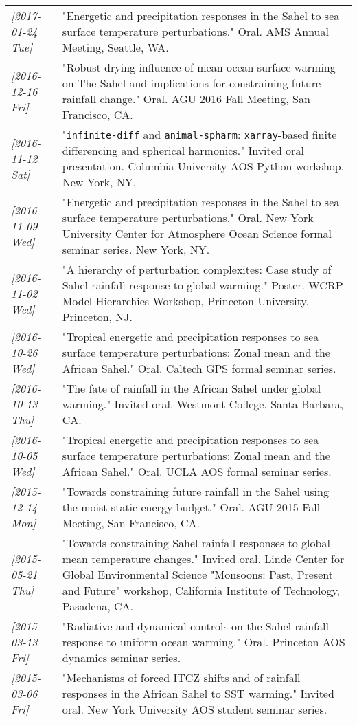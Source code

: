 \documentclass[12pt,letterpaper]{shillcv}
\begin{document}
\begin{center}
\begin{tabularx}{\textwidth}{lX}
\textit{[2017-01-24 Tue]} & "Energetic and precipitation responses in the Sahel to sea surface temperature perturbations."  Oral.  AMS Annual Meeting, Seattle, WA.\\
\textit{[2016-12-16 Fri]} & "Robust drying influence of mean ocean surface warming on The Sahel and implications for constraining future rainfall change."  Oral.  AGU 2016 Fall Meeting, San Francisco, CA.\\
\textit{[2016-11-12 Sat]} & "\texttt{infinite-diff} and \texttt{animal-spharm}: \texttt{xarray}-based finite differencing and spherical harmonics."  Invited oral presentation.  Columbia University AOS-Python workshop.  New York, NY.\\
\textit{[2016-11-09 Wed]} & "Energetic and precipitation responses in the Sahel to sea surface temperature perturbations."  Oral.  New York University Center for Atmosphere Ocean Science formal seminar series.  New York, NY.\\
\textit{[2016-11-02 Wed]} & "A hierarchy of perturbation complexites: Case study of Sahel rainfall response to global warming."  Poster.  WCRP Model Hierarchies Workshop, Princeton University, Princeton, NJ.\\
\textit{[2016-10-26 Wed]} & "Tropical energetic and precipitation responses to sea surface temperature perturbations: Zonal mean and the African Sahel."  Oral.  Caltech GPS formal seminar series.\\
\textit{[2016-10-13 Thu]} & "The fate of rainfall in the African Sahel under global warming."  Invited oral.  Westmont College, Santa Barbara, CA.\\
\textit{[2016-10-05 Wed]} & "Tropical energetic and precipitation responses to sea surface temperature perturbations: Zonal mean and the African Sahel."  Oral.  UCLA AOS formal seminar series.\\
\textit{[2015-12-14 Mon]} & "Towards constraining future rainfall in the Sahel using the moist static energy budget." Oral.  AGU 2015 Fall Meeting, San Francisco, CA.\\
\textit{[2015-05-21 Thu]} & "Towards constraining Sahel rainfall responses to global mean temperature changes."  Invited oral.  Linde Center for Global Environmental Science "Monsoons: Past, Present and Future" workshop, California Institute of Technology, Pasadena, CA.\\
\textit{[2015-03-13 Fri]} & "Radiative and dynamical controls on the Sahel rainfall response to uniform ocean warming."  Oral.  Princeton AOS dynamics seminar series.\\
\textit{[2015-03-06 Fri]} & "Mechanisms of forced ITCZ shifts and of rainfall responses in the African Sahel to SST warming."  Invited oral.  New York University AOS student seminar series.\\
\end{tabularx}
\end{center}
\end{document}
